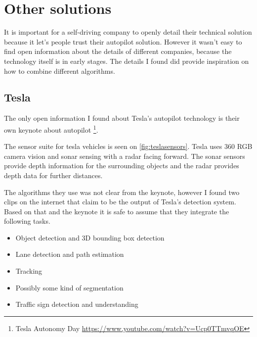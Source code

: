 \chapter{Other solutions}
\label{chap:relatedwork}

It is important for a self-driving company to openly detail their technical
solution because it let's people trust their autopilot solution. However it
wasn't easy to find open information about the details of different companies,
because the technology itself is in early stages. The details I found did
provide inspiration on how to combine different algorithms. 

\section{Tesla}
The only open information I found about Tesla's autopilot technology is their
own keynote about autopilot \footnote{Tesla Autonomy Day
\url{https://www.youtube.com/watch?v=Ucp0TTmvqOE}}.


The sensor suite for tesla vehicles is seen on \autoref{fig:teslasensors}. Tesla uses 360\degree
RGB camera vision and sonar sensing with a radar facing forward. The sonar
sensors provide depth information for the surrounding objects and the radar
provides depth data for further distances.  

The algorithms they use was not clear from the keynote, however I found two clips
on the internet that claim to be the output of Tesla's detection system. Based
on that and the keynote it is safe to assume that they integrate the following tasks.

\begin{itemize}
  \item Object detection and 3D bounding box detection
  \item Lane detection and path estimation
  \item Tracking
  \item Possibly some kind of segmentation
  \item Traffic sign detection and understanding
\end{itemize}

